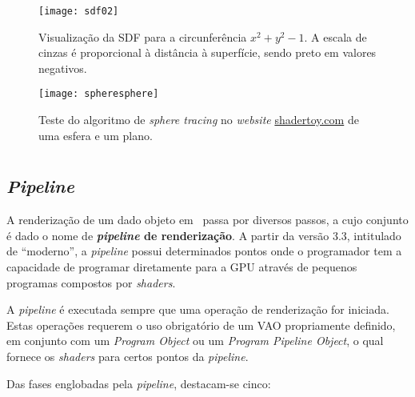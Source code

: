 \begin{figure}[!htbp]
	\centering
	\texttt{[image: sdf02]}
	\caption[\acs{SDF} para a circunferência $x^2 + y^2 - 1$]{Visualização da \acf{SDF} para a circunferência $x^2 + y^2 - 1$. A escala de cinzas é proporcional à distância à superfície, sendo preto em valores negativos.}
	\label{fig::sdf}
\end{figure}

\begin{figure}[!htbp]
	\centering
	\texttt{[image: spheresphere]}
	\caption[Teste do algoritmo de \textit{sphere tracing}]{Teste do algoritmo de \textit{sphere tracing} no \textit{website} \url{shadertoy.com} de uma esfera e um plano.}
	\label{fig::spheresphere}
\end{figure}


\section{\opengl}
\label{sec::arte:opengl}

\subsection{\textit{Pipeline}}
\label{ssec::arte:opengl:pipeline}

A renderização de um dado objeto em \opengl~passa por diversos passos, a cujo conjunto é dado o nome de \textbf{\textit{pipeline} de renderização}. A partir da versão 3.3, intitulado de ``\opengl moderno'', a \textit{pipeline} possui determinados pontos onde o programador tem a capacidade de programar diretamente para a \ac{GPU} através de pequenos programas compostos por \textit{shaders}.

A \textit{pipeline} é executada sempre que uma operação de renderização for iniciada. Estas operações requerem o uso obrigatório de um \ac{VAO} propriamente definido, em conjunto com um \textit{Program Object} ou um \textit{Program Pipeline Object}, o qual fornece os \textit{shaders} para certos pontos da \textit{pipeline}.

Das fases englobadas pela \textit{pipeline}, destacam-se cinco:

